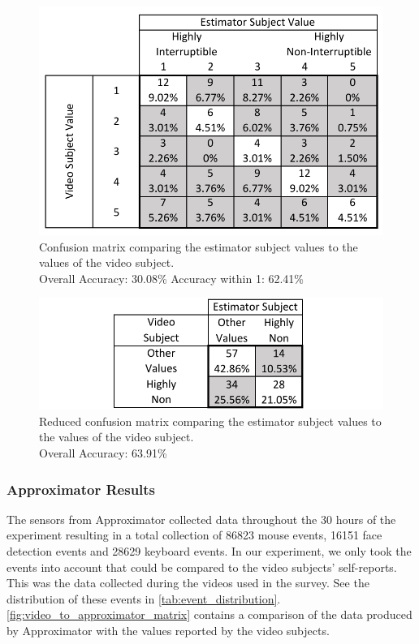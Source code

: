 \documentclass{sigchi}
\begin{document}
\begin{figure}[h]
  \centering
  \includegraphics[width=\columnwidth]{figures/VideoToEstimatorConfusionMatrix.pdf}
  \caption{Confusion matrix comparing the estimator subject values to the values of the video subject. \\Overall Accuracy: 30.08\% Accuracy within 1: 62.41\%}
  \label{fig:video_to_estimator_matrix}
\end{figure}

\begin{figure}[h]
  \centering
  \includegraphics[width=\columnwidth]{figures/VideoToEstimatorReducedConfusionMatrix.pdf}
  \caption{Reduced confusion matrix comparing the estimator subject values to the values of the video subject. \\Overall Accuracy: 63.91\%}
  \label{fig:reduced_video_to_estimator_matrix}
\end{figure}

\subsubsection{Approximator Results}
The sensors from Approximator collected data throughout the 30 hours of the experiment resulting in a total collection of 86823 mouse events, 16151 face detection events and 28629 keyboard events.
In our experiment, we only took the events into account that could be compared to the video subjects' self-reports.
This was the data collected during the videos used in the survey. See the distribution of these events in \autoref{tab:event_distribution}.
\autoref{fig:video_to_approximator_matrix} contains a comparison of the data produced by Approximator with the values reported by the video subjects.
\end{document}
